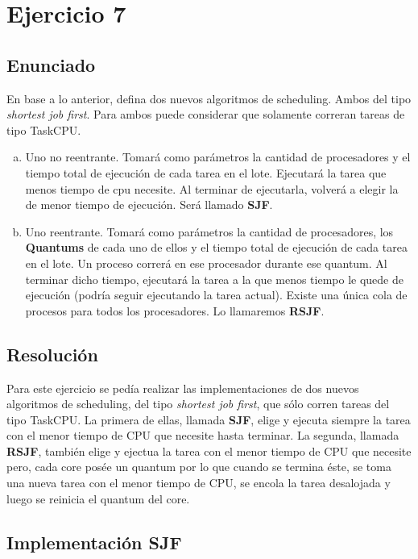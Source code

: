 \section{Ejercicio 7}

\subsection{Enunciado}
En base a lo anterior, defina dos nuevos algoritmos de scheduling. Ambos del tipo \textit{shortest job first}. Para ambos puede considerar que solamente correran tareas de tipo TaskCPU.

\begin{enumerate}[a)]
\item Uno no reentrante. Tomará como parámetros la cantidad de procesadores y el tiempo total de ejecución de cada tarea en el lote. Ejecutará la tarea que menos tiempo de cpu necesite. Al terminar de ejecutarla, volverá a elegir la de menor tiempo de ejecución.
Será llamado \textbf{SJF}.

\item Uno reentrante. Tomará como parámetros la cantidad de procesadores, los \textbf{Quantums} de cada uno de ellos y el tiempo total de ejecución de cada tarea en el lote. Un proceso correrá en ese procesador durante ese quantum. Al terminar dicho tiempo, ejecutará la tarea a la que menos tiempo le quede de ejecución (podría seguir ejecutando la tarea actual). Existe una única cola de procesos para todos los procesadores. Lo llamaremos
\textbf{RSJF}.
\end{enumerate}

\subsection{Resolución}

Para este ejercicio se pedía realizar las implementaciones de dos nuevos algoritmos de scheduling, del tipo \emph{shortest job first}, que sólo corren tareas del tipo TaskCPU.
La primera de ellas, llamada \textbf{SJF}, elige y ejecuta siempre la tarea con el menor tiempo de CPU que necesite hasta terminar.
La segunda, llamada \textbf{RSJF}, también elige y ejectua la tarea con el menor tiempo de CPU que necesite pero, cada core posée un quantum por lo que cuando se termina éste, se toma una nueva tarea con el menor tiempo de CPU, se encola la tarea desalojada y luego se reinicia el quantum del core.

\subsection{Implementación \textbf{SJF}}

